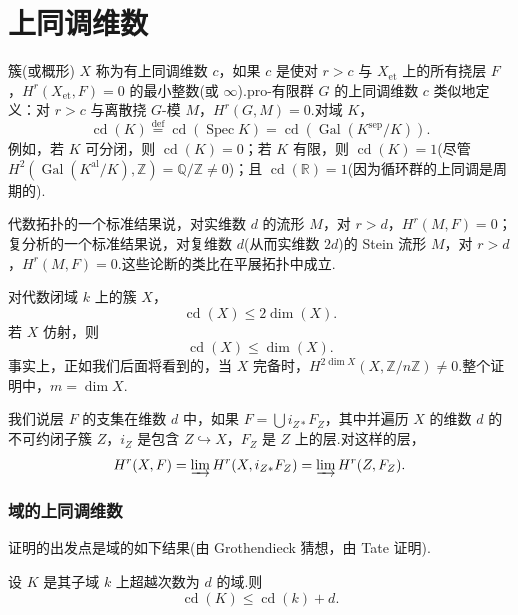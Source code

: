﻿%
\chapter{上同调维数}\label{sec:15}

簇(或概形) $X$ 称为有上同调维数 $c$，如果 $c$ 是使对 $r > c$ 与 $X_{\mathrm{et}}$ 上的所有挠层 $F$，$H^{r}(X_{\mathrm{et}}, F) = 0$ 的最小整数(或 $\infty$).pro-有限群 $G$ 的上同调维数 $c$ 类似地定义：对 $r > c$ 与离散挠 $G$-模 $M$，$H^{r}(G, M) = 0$.对域 $K$，
\[
\operatorname{cd}(K) \overset{\mathrm{def}}{=} \operatorname{cd}(\operatorname{Spec} K) = \operatorname{cd}(\operatorname{Gal}(K^{\mathrm{sep}}/K)).
\]
例如，若 $K$ 可分闭，则 $\operatorname{cd}(K) = 0$；若 $K$ 有限，则 $\operatorname{cd}(K) = 1$(尽管 $H^{2}(\operatorname{Gal}(K^{\mathrm{al}}/K), \mathbb{Z}) = \mathbb{Q}/\mathbb{Z} \neq 0$)；且 $\operatorname{cd}(\mathbb{R}) = 1$(因为循环群的上同调是周期的).

代数拓扑的一个标准结果说，对实维数 $d$ 的流形 $M$，对 $r > d$，$H^{r}(M, F) = 0$；复分析的一个标准结果说，对复维数 $d$(从而实维数 $2d$)的 Stein 流形 $M$，对 $r > d$，$H^{r}(M, F) = 0$.这些论断的类比在平展拓扑中成立.

\begin{theorem}\label{thm:15.1}
对代数闭域 $k$ 上的簇 $X$，
\[
\operatorname{cd}(X) \leq 2\dim(X).
\]
若 $X$ 仿射，则
\[
\operatorname{cd}(X) \leq \dim(X).
\]
事实上，正如我们后面将看到的，当 $X$ 完备时，$H^{2\dim X}(X, \mathbb{Z}/n\mathbb{Z}) \neq 0$.整个证明中，$m = \dim X$.
\end{theorem}

我们说层 $F$ 的支集在维数 $d$ 中，如果 $F = \bigcup i_{Z*}F_Z$，其中并遍历 $X$ 的维数 $d$ 的不可约闭子簇 $Z$，$i_Z$ 是包含 $Z \hookrightarrow X$，$F_Z$ 是 $Z$ 上的层.对这样的层，
\[
H^{r}(X, F) = \varinjlim H^{r}(X, i_{Z*}F_Z) = \varinjlim H^{r}(Z, F_Z).
\]

\subsection*{域的上同调维数}

证明的出发点是域的如下结果(由 Grothendieck 猜想，由 Tate 证明).

\begin{theorem}\label{thm:15.2}
设 $K$ 是其子域 $k$ 上超越次数为 $d$ 的域.则
\[
\operatorname{cd}(K) \leq \operatorname{cd}(k) + d.
\]
\end{theorem}

